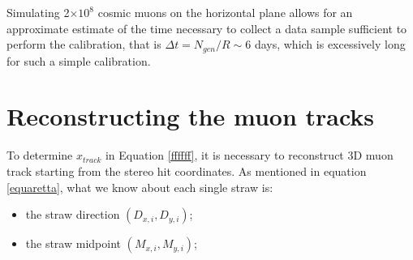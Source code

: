 {Simulating 2$\times 10^8$ cosmic 
muons on the horizontal plane allows for an 
approximate estimate of the time necessary to 
collect a data sample sufficient to perform the 
calibration, that is
$\Delta t = N_{gen}/R\sim 6$ days, which is 
excessively long 
for such a simple calibration. 

\section{Reconstructing the muon tracks}\label{reconstruction}
To determine $x_{track}$ in Equation \ref{ffffff}, 
it is necessary to reconstruct 3D muon track 
starting from the stereo hit coordinates.
As mentioned in equation \ref{equaretta}, 
what we know about each single straw is:
\begin{itemize}
    \item the straw direction $(D_{x,i},D_{y,i})$;
    \item the straw midpoint $(M_{x,i},M_{y,i})$;


\end{itemize}}
